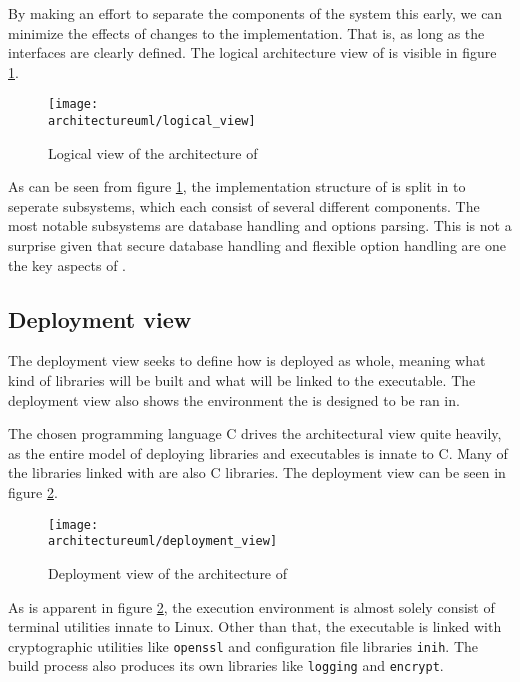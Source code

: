 By making an effort to separate the components of the system this early, we can
minimize the effects of changes to the implementation. That is, as long as the
interfaces are clearly defined. The logical architecture view of \pman is
visible in figure \ref{dia:logical_view}.

\begin{figure}[H]
    \centering
    \centerline{\texttt{[image: \\architectureuml/logical\_view]}}
    \caption{Logical view of the architecture of \pman}
    \label{dia:logical_view}
\end{figure}

As can be seen from figure \ref{dia:logical_view}, the implementation structure
of \pman is split in to seperate subsystems, which each consist of several
different components. The most notable subsystems are database handling and
options parsing. This is not a surprise given that secure database handling and
flexible option handling are one the key aspects of \pman.

\subsection{Deployment view}

The deployment view seeks to define how \pman is deployed as whole, meaning
what kind of libraries will be built and what will be linked to the executable.
The deployment view also shows the environment the \pman is designed to be
ran in.

The chosen programming language C drives the architectural view quite heavily,
as the entire model of deploying libraries and executables is innate to C. Many
of the libraries linked with \pman are also C libraries. The deployment view
can be seen in figure \ref{dia:deployment_view}.

\begin{figure}[H]
    \centering
    \centerline{\texttt{[image: \\architectureuml/deployment\_view]}}
    \caption{Deployment view of the architecture of \pman}
    \label{dia:deployment_view}
\end{figure}

As is apparent in figure \ref{dia:deployment_view}, the execution environment
is almost solely consist of terminal utilities innate to Linux. Other than that,
the \pman executable is linked with cryptographic utilities like \texttt{openssl}
and configuration file libraries \texttt{inih}. The build process also produces
its own libraries like \texttt{logging} and \texttt{encrypt}.
